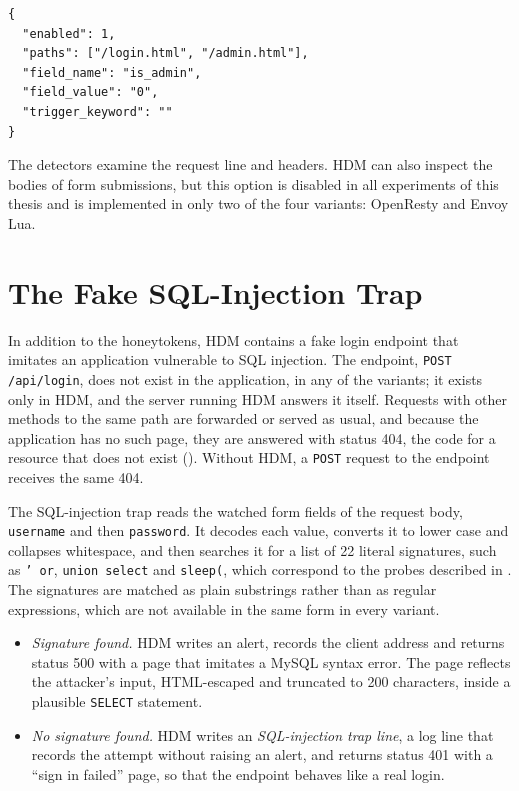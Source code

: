 \documentclass{rptuma}
\begin{document}
\begin{lstlisting}[caption={A form-field honeytoken. The hidden field \texttt{is\_admin=0} is
injected before \texttt{</form>} on the two pages with a form; submitting it with another value
raises an alert.}, label=lst:design.form, float=htbp]
{
  "enabled": 1,
  "paths": ["/login.html", "/admin.html"],
  "field_name": "is_admin",
  "field_value": "0",
  "trigger_keyword": ""
}
\end{lstlisting}

The detectors examine the request line and headers. HDM can also inspect the bodies of form
submissions, but this option is disabled in all experiments of this thesis and is implemented in
only two of the four variants: OpenResty and Envoy Lua.

\section{The Fake SQL-Injection Trap}
\label{sec:design.trap}

In addition to the honeytokens, HDM contains a fake login endpoint that imitates an application
vulnerable to SQL injection. The endpoint, \texttt{POST /api/login}, does not exist in the
application, in any of the variants; it exists only in HDM, and the server running HDM answers it itself.
Requests with other methods to the same path are forwarded or served as usual, and because the
application has no such page, they are answered with status 404, the code for a resource that does
not exist (). Without HDM, a \texttt{POST} request to the endpoint receives
the same 404.

The SQL-injection trap reads the watched form fields of the request body, \texttt{username} and then
\texttt{password}. It decodes each value, converts it to lower case and collapses whitespace, and
then searches it for a list of 22 literal signatures, such as \texttt{' or}, \texttt{union select}
and \texttt{sleep(}, which correspond to the probes described in . The
signatures are matched as plain substrings rather than as regular expressions, which are not
available in the same form in every variant.
\begin{itemize}
  \item \emph{Signature found.} HDM writes an alert, records the client address and returns
    status 500 with a page that imitates a MySQL syntax error. The page reflects the attacker's
    input, HTML-escaped and truncated to 200 characters, inside a plausible \texttt{SELECT}
    statement.
  \item \emph{No signature found.} HDM writes an \emph{SQL-injection trap line}, a log line that records the
    attempt without raising an alert, and returns status 401 with a ``sign in failed'' page, so that
    the endpoint behaves like a real login. 
\end{itemize}
\end{document}
